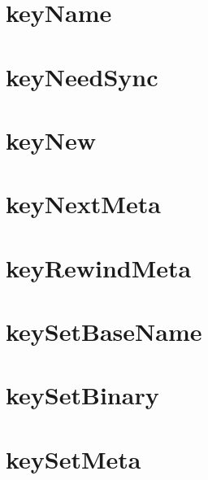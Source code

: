 \let\mypdfximage\pdfximage\def\pdfximage{\immediate\mypdfximage}\documentclass[twoside]{book}
\newcommand{\+}{\discretionary{\mbox{\scriptsize$\hookleftarrow$}}{}{}}
\begin{document}
\chapter{key\+Name}
\label{doc_contrib_api_reviews_core_keyName_md}

\chapter{key\+Need\+Sync}
\label{doc_contrib_api_reviews_core_keyNeedSync_md}

\chapter{key\+New}
\label{doc_contrib_api_reviews_core_keyNew_md}

\chapter{key\+Next\+Meta}
\label{doc_contrib_api_reviews_core_keyNextMeta_md}

\chapter{key\+Rewind\+Meta}
\label{doc_contrib_api_reviews_core_keyRewindMeta_md}

\chapter{key\+Set\+Base\+Name}
\label{doc_contrib_api_reviews_core_keySetBaseName_md}

\chapter{key\+Set\+Binary}
\label{doc_contrib_api_reviews_core_keySetBinary_md}

\chapter{key\+Set\+Meta}
\label{doc_contrib_api_reviews_core_keySetMeta_md}

\end{document}
